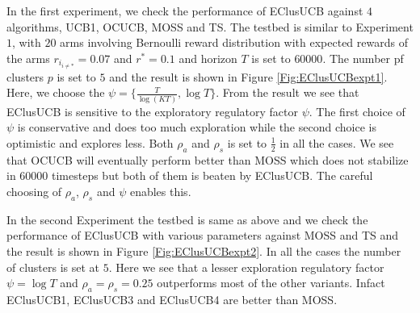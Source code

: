 In the first experiment, we check the performance of EClusUCB against $4$ algorithms, UCB1, OCUCB\cite{lattimore2015optimally}, MOSS and TS. The testbed is similar to Experiment $1$, with $20$ arms involving Bernoulli reward distribution with expected rewards of the arms $r_{i_{{i}\neq {*}}}=0.07$ and $r^{*}=0.1$ and horizon $T$ is set to $60000$. The number pf clusters $p$ is set to $5$ and the result is shown in Figure \ref{Fig:EClusUCBexpt1}. Here, we choose the $\psi=\lbrace \frac{T}{\log (KT)}, \log T\rbrace$. From the result we see that EClusUCB is sensitive to the exploratory regulatory factor $\psi$. The first choice of $\psi$ is conservative and does too much exploration while the second choice is optimistic and explores less. Both $\rho_{a}$ and $\rho_{s}$ is set to $\frac{1}{2}$ in all the cases. We see that OCUCB will eventually perform better than MOSS which does not stabilize in $60000$ timesteps but both of them is beaten by EClusUCB. The careful choosing of $\rho_{a}$, $\rho_{s}$ and $\psi$ enables this.
	
	In the second Experiment the testbed is same as above and we check the performance of EClusUCB with various parameters against MOSS and TS and the result is shown in Figure \ref{Fig:EClusUCBexpt2}. In all the cases the number of clusters is set at $5$. Here we see that a lesser exploration regulatory factor $\psi=\log T$ and $\rho_{a}=\rho_{s}=0.25$ outperforms most of the other variants. Infact EClusUCB1, EClusUCB3 and EClusUCB4 are better than MOSS.

